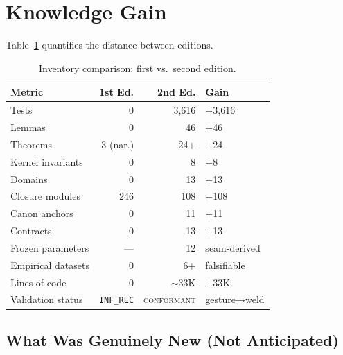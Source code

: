 \documentclass[
  aps,
  prd,
  preprint,
  superscriptaddress,
  nofootinbib,
  floatfix,
  longbibliography
]{revtex4-2}
\newcommand{\INF}{\texttt{INF\_REC}}
\newcommand{\regime}[1]{\textrm{\upshape\scshape#1}}
\newcommand{\conform}{\regime{conformant}}
\begin{document}
\section{Knowledge Gain}\label{sec:gain}

Table~\ref{tab:gain} quantifies the distance between editions.

\begin{table}[t]
\centering
\small
\caption{Inventory comparison: first vs.\ second edition.}
\label{tab:gain}
\begin{tabular}{@{}lrrl@{}}
\toprule
\textbf{Metric} & \textbf{1st Ed.} & \textbf{2nd Ed.} & \textbf{Gain} \\
\midrule
Tests               & 0       & 3{,}616  & +3{,}616 \\
Lemmas              & 0       & 46       & +46 \\
Theorems            & 3 (nar.)& 24+      & +24 \\
Kernel invariants   & 0       & 8        & +8 \\
Domains             & 0       & 13       & +13 \\
Closure modules & 246       & 108      & +108 \\
Canon anchors       & 0       & 11       & +11 \\
Contracts           & 0       & 13       & +13 \\
Frozen parameters   & —       & 12       & seam-derived \\
Empirical datasets  & 0       & 6+       & falsifiable \\
Lines of code       & 0       & $\sim$33K & +33K \\
Validation status   & \INF    & \conform{} & gesture→weld \\
\bottomrule
\end{tabular}
\end{table}

\subsection{What Was Genuinely New (Not Anticipated)}
\end{document}
